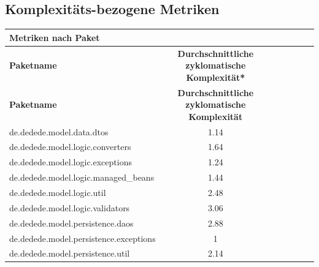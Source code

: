 \documentclass{article}
\begin{document}
\subsection{Komplexitäts-bezogene Metriken}

\begin{longtable}{@{\extracolsep{\fill}}lclclcl@{}}
\toprule
\multicolumn{4}{l}{\textbf{Metriken nach Paket}} \\* \midrule
\textbf{Paketname} & \textbf{Durchschnittliche zyklomatische Komplexität*} \\* \midrule
\endfirsthead
\textbf{Paketname} & \textbf{Durchschnittliche zyklomatische Komplexität} \\* \midrule
\endhead
de.dedede.model.data.dtos 				& 1.14 \\
de.dedede.model.logic.converters			& 1.64 \\
de.dedede.model.logic.exceptions			& 1.24 \\
de.dedede.model.logic.managed\_beans		& 1.44 \\
de.dedede.model.logic.util					& 2.48 \\
de.dedede.model.logic.validators			& 3.06 \\
de.dedede.model.persistence.daos			& 2.88 \\
de.dedede.model.persistence.exceptions		& 1 \\
de.dedede.model.persistence.util			& 2.14 \\* \bottomrule
\end{longtable}
\end{document}
